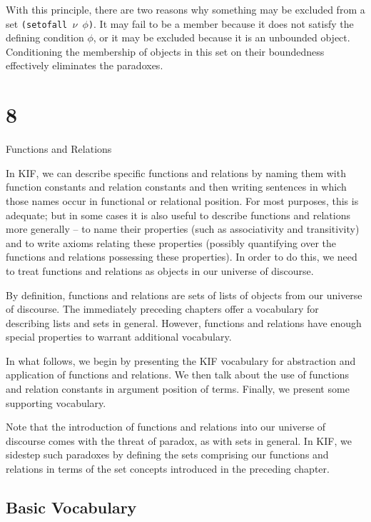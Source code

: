 With this principle, there are two reasons why something may be
excluded from a set {\tt (setofall $\nu$ $\phi$)}.  It may fail to be a
member because it does not satisfy the defining condition $\phi$, or it
may be excluded because it is an unbounded object. 
Conditioning the membership of objects in this set on their boundedness effectively
eliminates the paradoxes.

\vfill\eject

\chapter{8}{Functions and Relations}

In KIF, we can describe specific functions and relations by naming
them with function constants and relation constants and then writing
sentences in which those names occur in functional or relational
position.  For most purposes, this is adequate; but in some cases it
is also useful to describe functions and relations more generally --
to name their properties (such as associativity and transitivity) and
to write axioms relating these properties (possibly quantifying over
the functions and relations possessing these properties).  In order to
do this, we need to treat functions and relations as objects in our
universe of discourse.  

By definition, functions and relations are sets of lists of objects
from our universe of discourse.  The immediately preceding chapters
offer a vocabulary for describing lists and sets in general.  However,
functions and relations have enough special properties to warrant
additional vocabulary.

In what follows, we begin by presenting the KIF vocabulary for
abstraction and application of functions and relations.  We then talk
about the use of functions and relation constants in argument
position of terms.  Finally, we present some supporting vocabulary.

Note that the introduction of functions and relations into our
universe of discourse comes with the threat of paradox, as with sets in
general.  In KIF, we sidestep such paradoxes by defining the
sets comprising our functions and relations in terms of the set concepts
introduced in the preceding chapter.

\section{Basic Vocabulary}

